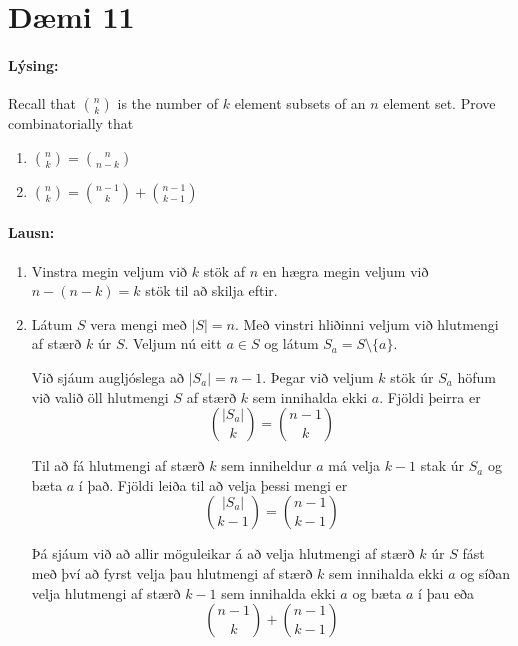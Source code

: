 \documentclass[a4paper,notitlepage]{article}
\theoremstyle{plain}
\theoremstyle{definition}
\begin{document}
\section*{Dæmi 11}
\paragraph{Lýsing:}
Recall that $\binom{n}{k}$ is the number of $k$ element subsets of an $n$ element set. Prove combinatorially that
\begin{enumerate}
    \item $\displaystyle \binom{n}{k} = \binom{n}{n-k}$
    \item $\displaystyle \binom{n}{k} = \binom{n-1}{k}+\binom{n-1}{k-1}$
\end{enumerate}

\paragraph{Lausn:}
\begin{enumerate}
    \item Vinstra megin veljum við $k$ stök af $n$ en hægra megin veljum við $n-(n-k) = k$ stök til að skilja eftir.

    \item Látum $S$ vera mengi með $|S| = n$. Með vinstri hliðinni veljum við hlutmengi af stærð $k$ úr $S$. Veljum nú eitt $a\in S$ og látum $S_a = S\setminus\{a\}$.

        Við sjáum augljóslega að $|S_a| = n-1$. Þegar við veljum $k$ stök úr $S_a$ höfum við valið öll hlutmengi $S$ af stærð $k$ sem innihalda ekki $a$. Fjöldi þeirra er 
        \begin{equation*}
            \binom{|S_a|}{k} = \binom{n-1}{k}
        \end{equation*}

        Til að fá hlutmengi af stærð $k$ sem inniheldur $a$ má velja $k-1$ stak úr $S_a$ og bæta $a$ í það. Fjöldi leiða til að velja þessi mengi er
        \begin{equation*}
            \binom{|S_a|}{k-1} = \binom{n-1}{k-1}
        \end{equation*}

        Þá sjáum við að allir möguleikar á að velja hlutmengi af stærð $k$ úr $S$ fást með því að fyrst velja þau hlutmengi af stærð $k$ sem innihalda ekki $a$ og síðan velja hlutmengi af stærð $k-1$ sem innihalda ekki $a$ og bæta $a$ í þau eða
        \begin{equation*}
            \binom{n-1}{k} + \binom{n-1}{k-1}
        \end{equation*}
\end{enumerate}
\end{document}
